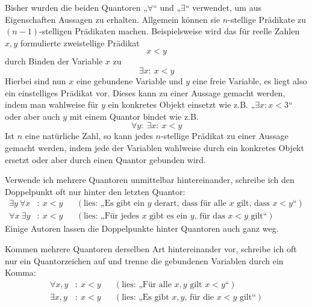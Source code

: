\begin{bem}
    Bisher wurden die beiden Quantoren „$\forall$“ und „$\exists$“ verwendet, um aus Eigenschaften Aussagen zu erhalten. Allgemein können sie $n$-stellige Prädikate zu $(n-1)$-stelligen Prädikaten machen. Beispielsweise wird das für reelle Zahlen $x,y$ formulierte zweistellige Prädikat
        \[ x < y \]
    durch Binden der Variable $x$ zu
        \[ \exists x:\ x<y \]
    Hierbei sind nun $x$ eine gebundene Variable und $y$ eine freie Variable, es liegt also ein einstelliges Prädikat vor. Dieses kann zu einer Aussage gemacht werden, indem man wahlweise für $y$ ein konkretes Objekt einsetzt wie z.B. „$\exists x: x < 3$“ oder aber auch $y$ mit einem Quantor bindet wie z.B.
        \[ \forall y:\ \exists x:\ x < y \]
    Ist $n$ eine natürliche Zahl, so kann jedes $n$-stellige Prädikat zu einer Aussage gemacht werden, indem jede der Variablen wahlweise durch ein konkretes Objekt ersetzt oder aber durch einen Quantor gebunden wird.
\end{bem}
 
 
\begin{nota}
    Verwende ich mehrere Quantoren unmittelbar hintereinander, schreibe ich den Doppelpunkt oft nur hinter den letzten Quantor:
    \begin{align*}
        \exists y\ \forall x& :\ x < y && (\text{lies: „Es gibt ein $y$ derart, dass für alle $x$ gilt, dass $x<y$“}) \\
        \forall x\ \exists y& :\ x < y && (\text{lies: „Für jedes $x$ gibt es ein $y$, für das $x<y$ gilt“})  
    \end{align*}
    Einige Autoren lassen die Doppelpunkte hinter Quantoren auch ganz weg.
    
    Kommen mehrere Quantoren derselben Art hintereinander vor, schreibe ich oft nur ein Quantorzeichen auf und trenne die gebundenen Variablen durch ein Komma:
    \begin{align*}
        \forall x,y&:\ x<y && (\text{lies: „Für alle $x,y$ gilt $x<y$“}) \\
        \exists x,y&:\ x<y && (\text{lies: „Es gibt $x,y$, für die $x<y$ gilt“}) 
    \end{align*}
\end{nota}

